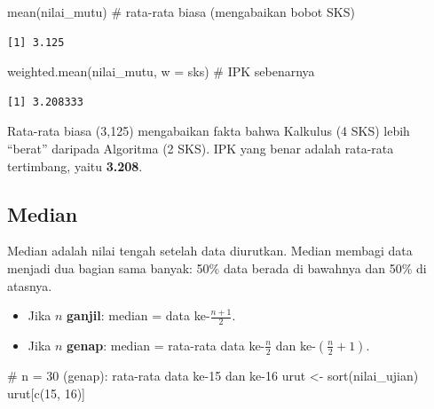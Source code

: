 \documentclass[
  indonesian,
  letterpaper,
]{book}
\newenvironment{Shaded}{\begin{snugshade}}{\end{snugshade}}
\newcommand{\AttributeTok}[1]{\textcolor[rgb]{0.40,0.45,0.13}{#1}}
\newcommand{\CommentTok}[1]{\textcolor[rgb]{0.37,0.37,0.37}{#1}}
\newcommand{\DecValTok}[1]{\textcolor[rgb]{0.68,0.00,0.00}{#1}}
\newcommand{\FunctionTok}[1]{\textcolor[rgb]{0.28,0.35,0.67}{#1}}
\newcommand{\NormalTok}[1]{\textcolor[rgb]{0.00,0.23,0.31}{#1}}
\newcommand{\OtherTok}[1]{\textcolor[rgb]{0.00,0.23,0.31}{#1}}
\providecommand{\tightlist}{%
  \setlength{\itemsep}{0pt}\setlength{\parskip}{0pt}}
\begin{document}
\begin{Shaded}
\begin{Highlighting}[]
\FunctionTok{mean}\NormalTok{(nilai\_mutu)                    }\CommentTok{\# rata{-}rata biasa (mengabaikan bobot SKS)}
\end{Highlighting}
\end{Shaded}

\begin{verbatim}
[1] 3.125
\end{verbatim}

\begin{Shaded}
\begin{Highlighting}[]
\FunctionTok{weighted.mean}\NormalTok{(nilai\_mutu, }\AttributeTok{w =}\NormalTok{ sks)  }\CommentTok{\# IPK sebenarnya}
\end{Highlighting}
\end{Shaded}

\begin{verbatim}
[1] 3.208333
\end{verbatim}

Rata-rata biasa (3,125) mengabaikan fakta bahwa Kalkulus (4 SKS) lebih
``berat'' daripada Algoritma (2 SKS). IPK yang benar adalah rata-rata
tertimbang, yaitu \textbf{3.208}.

\subsection{Median}\label{median}

Median adalah nilai tengah setelah data diurutkan. Median membagi data
menjadi dua bagian sama banyak: 50\% data berada di bawahnya dan 50\% di
atasnya.

\begin{itemize}
\tightlist
\item
  Jika \(n\) \textbf{ganjil}: median = data ke-\(\frac{n+1}{2}\).
\item
  Jika \(n\) \textbf{genap}: median = rata-rata data ke-\(\frac{n}{2}\)
  dan ke-\((\frac{n}{2}+1)\).
\end{itemize}

\begin{Shaded}
\begin{Highlighting}[]
\CommentTok{\# n = 30 (genap): rata{-}rata data ke{-}15 dan ke{-}16}
\NormalTok{urut }\OtherTok{\textless{}{-}} \FunctionTok{sort}\NormalTok{(nilai\_ujian)}
\NormalTok{urut[}\FunctionTok{c}\NormalTok{(}\DecValTok{15}\NormalTok{, }\DecValTok{16}\NormalTok{)]}
\end{Highlighting}
\end{Shaded}
\end{document}

